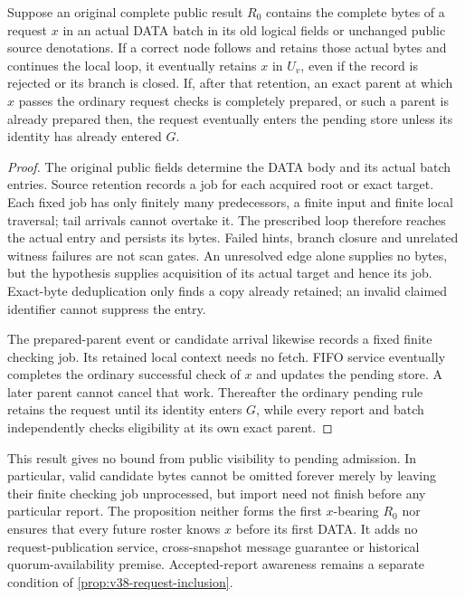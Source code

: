 \begin{proposition}
\label{prop:v39-public-request-import}
Suppose an original complete public result $R_0$ contains the complete
bytes of a request $x$ in an actual DATA batch in its old logical fields
or unchanged public source denotations. If a correct node follows and
retains those actual bytes and continues the local loop, it eventually
retains $x$ in $U_v$, even if the record is rejected or its branch is
closed. If, after that retention, an exact parent at which $x$ passes
the ordinary request checks is completely prepared, or such a parent
is already prepared then, the request eventually enters the pending
store unless its identity has already entered $G$.
\end{proposition}
\begin{proof}
The original public fields determine the DATA body and its actual batch
entries. Source retention records a job for each acquired root or exact
target. Each fixed job has only finitely many predecessors, a finite
input and finite local traversal; tail arrivals cannot overtake it.
The prescribed loop therefore reaches the actual entry and persists its
bytes. Failed hints, branch closure and unrelated witness failures are
not scan gates. An unresolved edge alone supplies no bytes, but the
hypothesis supplies acquisition of its actual target and hence its job.
Exact-byte deduplication only finds a copy already retained; an invalid
claimed identifier cannot suppress the entry.

The prepared-parent event or candidate arrival likewise records a fixed
finite checking job. Its retained local context needs no fetch. FIFO
service eventually completes the ordinary successful check of $x$ and
updates the pending store. A later parent cannot cancel that work.
Thereafter the ordinary pending rule retains the request until its
identity enters $G$, while every report and batch independently checks
eligibility at its own exact parent.
\end{proof}

This result gives no bound from public visibility to pending admission.
In particular, valid candidate bytes cannot be omitted forever merely
by leaving their finite checking job unprocessed, but import need not
finish before any particular report. The proposition neither forms
the first $x$-bearing $R_0$ nor ensures that every future roster knows
$x$ before its first DATA. It adds no request-publication service,
cross-snapshot message guarantee or historical quorum-availability
premise. Accepted-report awareness remains a separate condition of
\cref{prop:v38-request-inclusion}.

